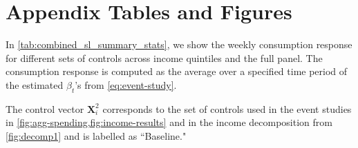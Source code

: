 \documentclass[12pt]{article}
\begin{document}
\clearpage
\begin{singlespace}
%
%


\end{singlespace}



\newpage
\appendix
\setcounter{table}{0}
\renewcommand{\tablename}{Appendix Table}
\renewcommand{\figurename}{Appendix Figure}
\renewcommand{\thetable}{A\arabic{table}}
\setcounter{figure}{0}
\renewcommand{\thefigure}{A\arabic{figure}}

\section{Appendix Tables and Figures}
\label{sec:appendix}


In \cref{tab:combined_sl_summary_stats}, we show the weekly consumption response for different sets of controls across income quintiles and the full panel. The consumption response is computed as the average over a specified time period of the estimated $\beta_{t}$'s from \cref{eq:event-study}.

The control vector $\mathbf{X}^{2}_{i}$ corresponds to the set of controls used in the event studies in \cref{fig:agg-spending,fig:income-results} and in the income decomposition from \cref{fig:decomp1} and is labelled as ``Baseline."

% 

% 

% 


\end{document}
